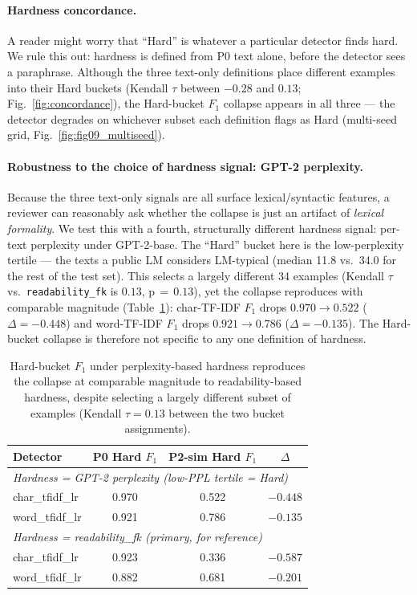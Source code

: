 \documentclass[11pt,a4paper]{article}
\begin{document}
\paragraph{Hardness concordance.}
A reader might worry that ``Hard'' is whatever a particular detector finds
hard. We rule this out: hardness is defined from P0 text alone, before the
detector sees a paraphrase. Although the three text-only definitions place
different examples into their Hard buckets (Kendall $\tau$ between $-0.28$ and
$0.13$; Fig.~\ref{fig:concordance}), the Hard-bucket $F_1$ collapse appears
in all three — the detector degrades on whichever subset each definition
flags as Hard (multi-seed grid, Fig.~\ref{fig:fig09_multiseed}).

\paragraph{Robustness to the choice of hardness signal: GPT-2 perplexity.}
Because the three text-only signals are all surface lexical/syntactic
features, a reviewer can reasonably ask whether the collapse is just an
artifact of \emph{lexical formality}. We test this with a fourth, structurally
different hardness signal: per-text perplexity under GPT-2-base. The
``Hard'' bucket here is the low-perplexity tertile — the texts a public LM
considers LM-typical (median 11.8 vs.\ 34.0 for the rest of the test set).
This selects a largely different 34 examples (Kendall $\tau$ vs.\
\texttt{readability\_fk} is $0.13$, p\,$=\,0.13$), yet the collapse
reproduces with comparable magnitude (Table~\ref{tab:ppl_collapse}):
char-TF-IDF $F_1$ drops $0.970 \!\to\! 0.522$ ($\Delta = -0.448$) and
word-TF-IDF $F_1$ drops $0.921 \!\to\! 0.786$ ($\Delta = -0.135$).
The Hard-bucket collapse is therefore not specific to any one definition of
hardness.

\begin{table}[H]
\centering
\small
\begin{tabular}{lccc}
\toprule
\textbf{Detector} & \textbf{P0 Hard $F_1$} & \textbf{P2-sim Hard $F_1$} & $\Delta$ \\
\midrule
\multicolumn{4}{l}{\emph{Hardness = GPT-2 perplexity (low-PPL tertile = Hard)}} \\
char\_tfidf\_lr & 0.970 & 0.522 & $\mathbf{-0.448}$ \\
word\_tfidf\_lr & 0.921 & 0.786 & $-0.135$ \\
\midrule
\multicolumn{4}{l}{\emph{Hardness = readability\_fk (primary, for reference)}} \\
char\_tfidf\_lr & 0.923 & 0.336 & $\mathbf{-0.587}$ \\
word\_tfidf\_lr & 0.882 & 0.681 & $-0.201$ \\
\bottomrule
\end{tabular}
\caption{Hard-bucket $F_1$ under perplexity-based hardness reproduces the
collapse at comparable magnitude to readability-based hardness, despite
selecting a largely different subset of examples (Kendall $\tau = 0.13$ between
the two bucket assignments).}
\label{tab:ppl_collapse}
\end{table}
\end{document}
